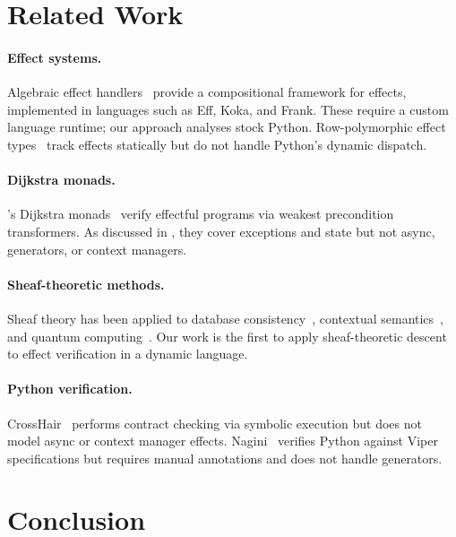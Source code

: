 \documentclass[11pt]{article}
\begin{document}
\section{Related Work}\label{sec:related}

\paragraph{Effect systems.}
Algebraic effect handlers~\cite{plotkin-power} provide a compositional
framework for effects, implemented in languages such as Eff, Koka, and
Frank.  These require a custom language runtime; our approach analyses
stock Python.  Row-polymorphic effect types~\cite{leijen-koka} track
effects statically but do not handle Python's dynamic dispatch.

\paragraph{Dijkstra monads.}
\Fstar{}'s Dijkstra monads~\cite{fstar-effects} verify effectful
programs via weakest precondition transformers.  As discussed in
, they cover exceptions and state but not async,
generators, or context managers.

\paragraph{Sheaf-theoretic methods.}
Sheaf theory has been applied to database consistency~\cite{goguen-sheaves},
contextual semantics~\cite{abramsky-sheaves}, and quantum
computing~\cite{abramsky-brandenburger}.  Our work is the first to
apply sheaf-theoretic descent to effect verification in a dynamic
language.

\paragraph{Python verification.}
CrossHair~\cite{crosshair} performs contract checking via symbolic
execution but does not model async or context manager effects.
Nagini~\cite{nagini} verifies Python against Viper specifications
but requires manual annotations and does not handle generators.

\section{Conclusion}\label{sec:conclusion}
\end{document}
